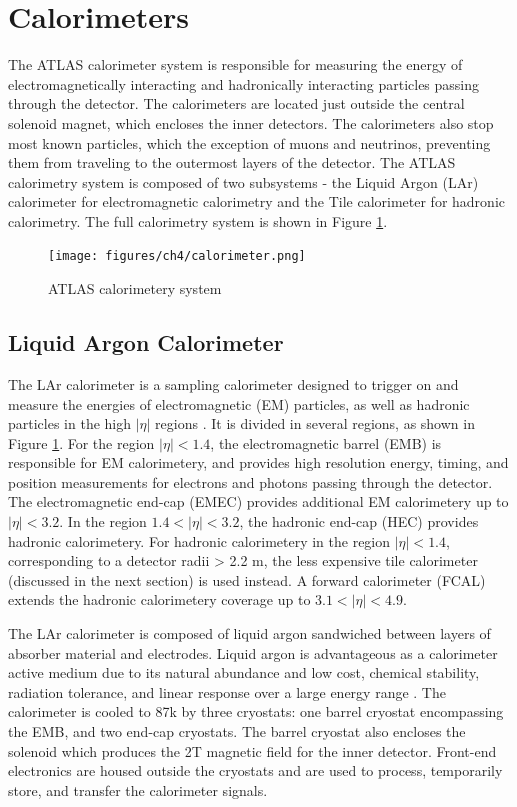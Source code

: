 \section{Calorimeters}
The ATLAS calorimeter system is responsible for measuring the energy of electromagnetically interacting and hadronically interacting particles passing through the detector. The calorimeters are located just outside the central solenoid magnet, which encloses the inner detectors. The calorimeters also stop most known particles, which the exception of muons and neutrinos, preventing them from traveling to the outermost layers of the detector. The ATLAS calorimetry system is composed of two subsystems - the Liquid Argon (LAr) calorimeter for electromagnetic calorimetry and the Tile calorimeter for hadronic calorimetry. The full calorimetry system is shown in Figure \ref{fig:calorimeters}.

\begin{figure}
        \centering
	\texttt{[image: figures/ch4/calorimeter.png]}
	\caption{ATLAS calorimetery system \cite{calorimeter_img}}
	\label{fig:calorimeters}
\end{figure}

\subsection{Liquid Argon Calorimeter}
\label{sec:lar}
The LAr calorimeter is a sampling calorimeter designed to trigger on and measure the energies of electromagnetic (EM) particles, as well as hadronic particles in the high $|\eta|$ regions  \cite{lar_tdr}. It is divided in several regions, as shown in Figure \ref{fig:calorimeters}. For the region $|\eta| < 1.4$, the electromagnetic barrel (EMB) is responsible for EM calorimetery, and provides high resolution energy, timing, and position measurements for electrons and photons passing through the detector. The electromagnetic end-cap (EMEC) provides additional EM calorimetery up to $|\eta|<3.2$. In the region $1.4 < |\eta| < 3.2$, the hadronic end-cap (HEC) provides hadronic calorimetery. For hadronic calorimetery in the region $|\eta| < 1.4$, corresponding to a detector radii > 2.2 m, the less expensive tile calorimeter (discussed in the next section) is used instead. A forward calorimeter (FCAL) extends the hadronic calorimetery coverage up to $3.1 < |\eta| < 4.9$. \par
 
The LAr calorimeter is composed of liquid argon sandwiched between layers of absorber material and electrodes. Liquid argon is advantageous as a calorimeter active medium due to its natural abundance and low cost, chemical stability, radiation tolerance, and linear response over a large energy range \cite{lar_ssc}. The calorimeter is cooled to 87k by three cryostats: one barrel cryostat encompassing the EMB, and two end-cap cryostats. The barrel cryostat also encloses the solenoid which produces the 2T magnetic field for the inner detector. Front-end electronics are housed outside the cryostats and are used to process, temporarily store, and transfer the calorimeter signals. \par

